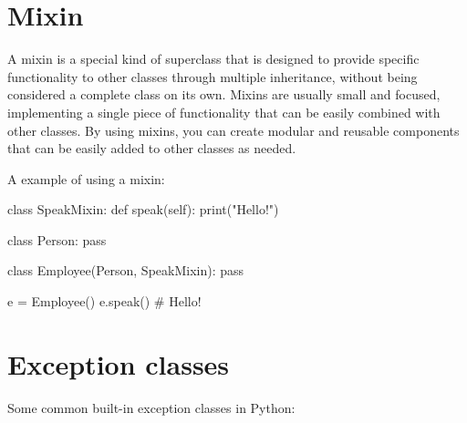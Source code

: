 \documentclass[12pt, a4paper, oneside, justified]{article}
\begin{document}
\section{Mixin}
A mixin is a special kind of superclass that is designed to provide specific functionality to
other classes through multiple inheritance, without being considered a complete class on its
own. Mixins are usually small and focused, implementing a single piece of functionality that can
be easily combined with other classes. By using mixins, you can create modular and reusable
components that can be easily added to other classes as needed.

A example of using a mixin:
\begin{python}
    class SpeakMixin:
        def speak(self):
            print("Hello!")

    class Person:
        pass
    
    class Employee(Person, SpeakMixin):
        pass

    e = Employee()
    e.speak() # Hello!
\end{python}

\section{Exception classes}
Some common built-in exception classes in Python:
\end{document}
